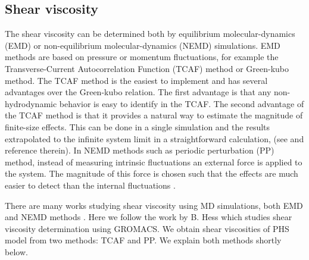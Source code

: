 \documentclass[preprint,pre,aps,superscriptaddress,a4paper]{revtex4}
\begin{document}
\subsection{Shear viscosity} 
The shear viscosity can be determined both by equilibrium molecular-dynamics (EMD) or non-equilibrium molecular-dynamics (NEMD) simulations.
EMD methods are based on pressure or momentum fluctuations, for example the Transverse-Current Autocorrelation Function  (TCAF) method or Green-kubo method.
The TCAF method is the easiest to implement and has several  advantages over the Green-kubo relation. The first advantage is that any non-hydrodynamic behavior is easy to identify in the TCAF. The second advantage of the TCAF method is that it provides a natural way to estimate the magnitude of finite-size effects.
This can
be done in a single simulation and the results extrapolated to the infinite system limit in a straightforward calculation, (see \cite{palmer:94:0} and reference therein).
In NEMD methods such as  periodic perturbation (PP) method, instead of measuring intrinsic fluctuations   an  external force is applied to the system.  The magnitude of this force is chosen such that the effects are much easier to detect  than the internal fluctuations \cite{zhao:08:00,hess:02:0,Gregori:12:0,Gaskell:74:00}. 

There are many works studying shear viscosity  using MD simulations, both EMD and NEMD methods \cite{zhao:08:00,Gaskell:74:00,palmer:94:0,plathe:02:00,sunda:13:00,Gezeltr:10:0,Rowley:07:0,Sun:08:0,hess:02:0}.
Here we follow the work by B. Hess \cite{hess:02:0} which studies shear viscosity determination using GROMACS. We obtain shear viscosities of PHS model from  two methods:  TCAF and PP. We explain both methods shortly below.
\end{document}
